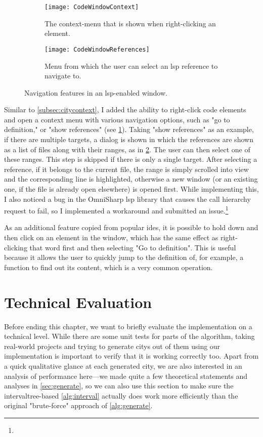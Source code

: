 \documentclass[../thesis]{subfiles}
\begin{document}
\begin{figure}
	\centering
	\begin{subfigure}{0.47\textwidth}
		\texttt{[image: CodeWindowContext]}
		\caption{The context-menu that is shown when right-clicking an element.}\label{fig:windowcontext}
	\end{subfigure}
	\begin{subfigure}{0.47\textwidth}
		\texttt{[image: CodeWindowReferences]}
		\caption{Menu from which the user can select an \gls{lsp} reference to navigate to.}\label{fig:windowmenu}
	\end{subfigure}
	\caption{Navigation features in an \gls{lsp}-enabled \gls{window}.}\label{fig:windownav}
\end{figure}


Similar to \cref{subsec:citycontext}, I added the ability to right-click code elements and open a context menu with various navigation options, such as "go to definition," or "show references" (see \cref{fig:windowcontext}).
Taking "show references" as an example, if there are multiple targets, a dialog is shown in which the references are shown as a list of files along with their ranges, as in \cref{fig:windowmenu}.
The user can then select one of these ranges.
This step is skipped if there is only a single target.
After selecting a reference, if it belongs to the current file, the range is simply scrolled into view and the corresponding line is highlighted, otherwise a new \gls{window} (or an existing one, if the file is already open elsewhere) is opened first.
While implementing this, I also noticed a bug in the OmniSharp \gls{lsp} library that causes the call hierarchy request to fail, so I implemented a workaround and submitted an issue.\footnote{
}

As an additional feature copied from popular \glspl{ide}, it is possible to hold down  and then click on an element in the \gls{window}, which has the same effect as right-clicking that word first and then selecting "Go to definition".
This is useful because it allows the user to quickly jump to the definition of, for example, a function to find out its content, which is a very common operation.

\section{Technical Evaluation}\label{sec:techeval}
Before ending this chapter, we want to briefly evaluate the implementation on a technical level.
While there are some unit tests for parts of the algorithm, taking real-world projects and trying to generate \glspl{city} out of them using our implementation is important to verify that it is working correctly too.
Apart from a quick qualitative glance at each generated city, we are also interested in an analysis of performance here---we made quite a few theoretical statements and analyses in \cref{sec:generate}, so we can also use this section to make sure the \gls{intervaltree}-based \cref{alg:interval} actually does work more efficiently than the original "brute-force" approach of \cref{alg:generate}.
\end{document}
